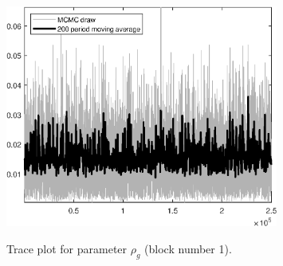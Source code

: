 \begin{figure}[H]
\centering
  \includegraphics[width=0.8\textwidth]{BRS_growth_ext_comovement/graphs/TracePlot_rho_g_blck_1}\\
    \caption{Trace plot for parameter ${\rho_g}$ (block number 1).}
\end{figure}
